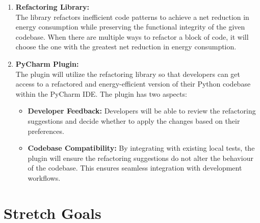 \documentclass{article}
\begin{document}
\begin{enumerate}
    \item \textbf{Refactoring Library:} \\
    The library refactors inefficient code patterns to achieve a net reduction in energy consumption while preserving the functional integrity of the given codebase. When there are multiple ways to refactor a block of code, it will choose the one with the greatest net reduction in energy consumption.

    \item \textbf{PyCharm Plugin:} \\
    The plugin will utilize the refactoring library so that developers can get access to a refactored and energy-efficient version of their Python codebase within the PyCharm IDE. The plugin has two aspects:

    \begin{itemize}
        \item \textbf{Developer Feedback:} Developers will be able to review the refactoring suggestions and decide whether to apply the changes based on their preferences.
        \item \textbf{Codebase Compatibility:} By integrating with existing local tests, the plugin will ensure the refactoring suggestions do not alter the behaviour of the codebase. This ensures seamless integration with development workflows.
    \end{itemize}
\end{enumerate}

\section{Stretch Goals}
\end{document}
